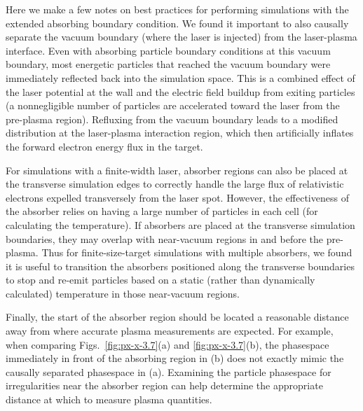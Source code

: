 \documentclass[../absorber.tex]{subfiles}
\begin{document}
Here we make a few notes on best practices for performing simulations with the extended absorbing boundary condition.  We found it important to also causally separate the vacuum boundary (where the laser is injected) from the laser-plasma interface.  Even with absorbing particle boundary conditions at this vacuum boundary, most energetic particles that reached the vacuum boundary were immediately reflected back into the simulation space.  This is a combined effect of the laser potential at the wall and the electric field buildup from exiting particles (a nonnegligible number of particles are accelerated toward the laser from the pre-plasma region).  Refluxing from the vacuum boundary leads to a modified distribution at the laser-plasma interaction region, which then artificially inflates the forward electron energy flux in the target.


For simulations with a finite-width laser, absorber regions can also be placed at the transverse simulation edges to correctly handle the large flux of relativistic electrons expelled transversely from the laser spot.  However, the effectiveness of the absorber relies on having a large number of particles in each cell (for calculating the temperature).  If absorbers are placed at the transverse simulation boundaries, they may overlap with near-vacuum regions in and before the pre-plasma.
Thus for finite-size-target simulations with multiple absorbers, we found it is useful to transition the absorbers positioned along the transverse boundaries to stop and re-emit particles based on a static (rather than dynamically calculated) temperature in those near-vacuum regions.

Finally, the start of the absorber region should be located a reasonable distance away from where accurate plasma measurements are expected.  For example, when comparing Figs.~\ref{fig:px-x-3.7}(a) and \ref{fig:px-x-3.7}(b), the phasespace immediately in front of the absorbing region in (b) does not exactly mimic the causally separated phasespace in (a).  Examining the particle phasespace for irregularities near the absorber region can help determine the appropriate distance at which to measure plasma quantities.
\end{document}

